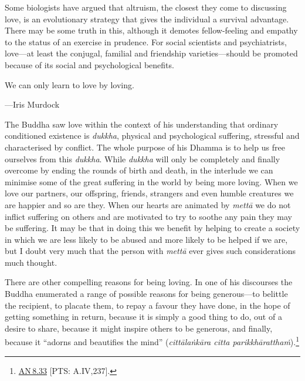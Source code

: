 \documentclass[10pt, openright]{book}
\newenvironment{epigram-2}%
{%
\vspace{1em}
\noindent
\quoting[leftmargin=2.5cm,rightmargin=2.5cm]%
\begin{itshape}
\large
}%
{\end{itshape}\endquoting
}%
\newenvironment{epigram-2-cite}%
{%
\quoting[leftmargin=2.5cm,rightmargin=2.5cm]%
\noindent\normal\hspace*{\fill} 
}%
{\endquoting\vspace{1em}
}%
\begin{document}
Some biologists have argued that altruism, the closest they come to discussing love, is an evolutionary strategy that gives the individual a survival advantage. There may be some truth in this, although it demotes fellow-feeling and empathy to the status of an exercise in prudence. For social scientists and psychiatrists, love—at least the conjugal, familial and friendship varieties—should be promoted because of its social and psychological benefits.


\begin{epigram-2}
We can only learn to love by loving.
\end{epigram-2}

\begin{epigram-2-cite}
—Iris Murdock
\end{epigram-2-cite}

The Buddha saw love within the context of his understanding that ordinary conditioned existence is \textit{dukkha}, physical and psychological suffering, stressful and characterised by conflict. The whole purpose of his Dhamma is to help us free ourselves from this \textit{dukkha}. While \textit{dukkha} will only be completely and finally overcome by ending the rounds of birth and death, in the interlude we can minimise some of the great suffering in the world by being more loving. When we love our partners, our offspring, friends, strangers and even humble creatures we are happier and so are they. When our hearts are animated by \textit{mettā} we do not inflict suffering on others and are motivated to try to soothe any pain they may be suffering. It may be that in doing this we benefit by helping to create a society in which we are less likely to be abused and more likely to be helped if we are, but I doubt very much that the person with \textit{mettā} ever gives such considerations much thought.


There are other compelling reasons for being loving. In one of his discourses the Buddha enumerated a range of possible reasons for being generous—to belittle the recipient, to placate them, to repay a favour they have done, in the hope of getting something in return, because it is simply a good thing to do, out of a desire to share, because it might inspire others to be generous, and finally, because it “adorns and beautifies the mind” (\textit{cittālaṅkāra citta parikkhāratthaṁ}).\footnote {\href{https://suttacentral.net/an8.33/en/sujato}{AN 8.33} [PTS: A.IV,237].}
\end{document}
